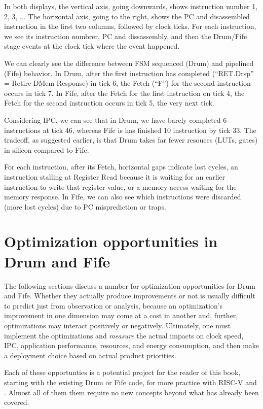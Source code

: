 In both displays, the vertical axis, going downwards, shows
instruction number 1, 2, 3, ...  The horizontal axis, going to the
right, shows the PC and disassembled instruction in the first two
columns, followed by clock ticks.  For each instruction, we see its
instruction numbrer, PC and dissassembly, and then the Drum/Fife stage
events at the clock tick where the event happened.

We can clearly see the difference between FSM sequenced (Drum) and
pipelined (Fife) behavior.  In Drum, after the first instruction has
completed (``RET.Drsp'' = Retire DMem Response) in tick 6, the Fetch
(``F'') for the second instruction occurs in tick 7.  In Fife, after
the Fetch for the first instruction on tick 4, the Fetch for the
second instruction occurs in tick 5, the very next tick.

Considering IPC, we can see that in Drum, we have barely completed 6
instructions at tick 46, whereas Fife is has finished 10 instruction
by tick 33.  The tradeoff, as suggested earlier, is that Drum takes
far fewer resouces (LUTs, gates) in silicon compared to Fife.

For each instruction, after its Fetch, horizontal gaps indicate lost
cycles, {\eg} an instruction stalling at Register Read because it is
waiting for an earlier instruction to write that register value, or a
memory access waiting for the memory response.  In Fife, we can also
see which instructions were discarded (more lost cycles) due to PC
misprediction or traps.


\section{Optimization opportunities in Drum and Fife}

The following sections discuss a number for optimization opportunities
for Drum and Fife.  Whether they actually produce improvements or not
is usually difficult to predict just from observation or analysis,
because an optimization's improvement in one dimension may come at a
cost in another and, further, optimizations may interact positively or
negatively.  Ultimately, one must implement the optimizations and
\emph{measure} the actual impacts on clock speed, IPC, application
performance, resources, and energy consumption, {\etc} and then make a
deployment choice based on actual product priorities.

Each of these opportunties is a potential project for the reader of
this book, starting with the existing Drum or Fife code, for more
practice with RISC-V and {\BSV}.  Almost all of them them require no new
{\BSV} concepts beyond what has already been covered.

